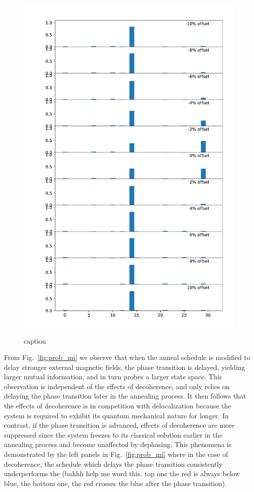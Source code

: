 \documentclass[prd,twocolumn,tightenlines,preprintnumbers,showpacs,superscriptaddress,notitlepage,nofootinbib,eqsecnum,floatfix,longbibliography]{revtex4}
\begin{document}
\begin{figure}
	\centering
	\includegraphics[width=\columnwidth]{./figures/final_state_distribution.pdf}
	\caption{caption}
	\label{fig:final_state_distribution}
\end{figure}

From Fig.~\ref{fig:prob_mi} we observe that when the anneal schedule is modified to delay stronger external magnetic fields, the phase transition is delayed, yielding larger mutual information, and in turn probes a larger state space. This observation is independent of the effects of decoherence, and only relies on delaying the phase transition later in the annealing process. It then follows that the effects of decoherence is in competition with delocalization because the system is required to exhibit its quantum mechanical nature for longer. In contrast, if the phase transition is advanced, effects of decoherence are more suppressed since the system freezes to its classical solution earlier in the annealing process and {\color{blue}become unaffected by dephasing.} This phenomena is demonstrated by the left panels in Fig.~\ref{fig:prob_mi} where in the case of decoherence, the schedule which delays the phase transition consistently underperforms the (bahhh help me word this. top one the red is always below blue, the bottom one, the red crosses the blue after the phase transition).
\end{document}
